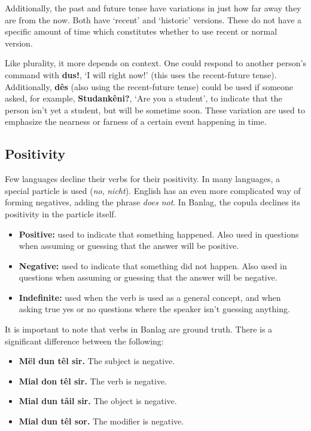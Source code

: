 \documentclass[12pt]{report}
\begin{document}
Additionally, the past and future tense have variations in just how far away they are from the now. Both have `recent' and `historic' versions. These do not have a specific amount of time which constitutes whether to use recent or normal version. 

Like plurality, it more depends on context. One could respond to another person's command with \textbf{dus!}, `I will right now!' (this uses the recent-future tense). Additionally, \textbf{d\^es} (also using the recent-future tense) could be used if someone asked, for example, \textbf{Studank\^eni?}, `Are you a student', to indicate that the person isn't yet a student, but will be sometime soon. These variation are used to emphasize the nearness or farness of a certain event happening in time.

\subsection{Positivity}
Few languages decline their verbs for their positivity. In many languages, a special particle is used (\textit{no}, \textit{nicht}). English has an even more complicated way of forming negatives, adding the phrase \textit{does not}. In Banlag, the copula declines its positivity in the particle itself.

\begin{itemize}
\item \textbf{Positive:} used to indicate that something happened. Also used in questions when assuming or guessing that the answer will be positive.
\item \textbf{Negative:} used to indicate that something did not happen. Also used in questions when assuming or guessing that the answer will be negative.
\item \textbf{Indefinite:} used when the verb is used as a general concept, and when asking true yes or no questions where the speaker isn't guessing anything.
\end{itemize}

It is important to note that verbs in Banlag are ground truth. There is a significant difference between the following:

\begin{itemize}
\item \textbf{M\"el dun t\^el sir.} The subject is negative.
\item \textbf{Mial don t\^el sir.} The verb is negative.
\item \textbf{Mial dun t\^ail sir.} The object is negative.
\item \textbf{Mial dun t\^el sor.} The modifier is negative.
\end{itemize}
\end{document}

